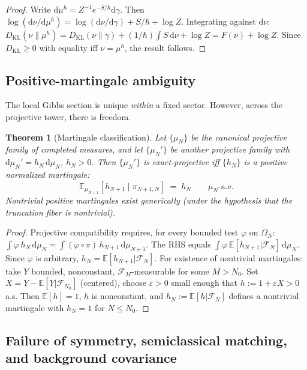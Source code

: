 \documentclass[12pt,a4paper]{article}
\theoremstyle{plain}
\newtheorem{theorem}{Theorem}[section]
\theoremstyle{definition}
\theoremstyle{remark}
\newcommand{\dd}{\mathrm{d}}
\newcommand{\cF}{\mathcal{F}}
\newcommand{\E}{\mathbb{E}}
\newcommand{\DKL}{D_{\mathrm{KL}}}
\begin{document}
\begin{proof}
Write $\dd\mu^\hbar = Z^{-1}e^{-S/\hbar}\dd\gamma$.  Then
$\log(\dd\nu/\dd\mu^\hbar) = \log(\dd\nu/\dd\gamma) + S/\hbar +
\log Z$.  Integrating against $\dd\nu$:
$\DKL(\nu\|\mu^\hbar) = \DKL(\nu\|\gamma) + (1/\hbar)\int S\,\dd\nu
+ \log Z = F(\nu) + \log Z$.  Since $\DKL \ge 0$ with equality iff
$\nu = \mu^\hbar$, the result follows.
\end{proof}

\subsection{Positive-martingale ambiguity}

The local Gibbs section is unique \emph{within} a fixed sector.
However, across the projective tower, there is freedom.

\begin{theorem}[Martingale classification]
\label{thm:martingale}
Let $\{\mu_N\}$ be the canonical projective family of completed
measures, and let $\{\mu_N'\}$ be another projective family with
$\dd\mu_N' = h_N\,\dd\mu_N$, $h_N > 0$.  Then $\{\mu_N'\}$ is
exact-projective iff $\{h_N\}$ is a positive normalized martingale:
\begin{equation}
  \E_{\mu_{N+1}}[h_{N+1} \mid \pi_{N+1,N}] \;=\; h_N
  \qquad \mu_N\text{-a.e.}
\end{equation}
Nontrivial positive martingales exist generically
(under the hypothesis that the truncation fiber is nontrivial).
\end{theorem}

\begin{proof}
Projective compatibility requires, for every bounded test $\varphi$
on $\Omega_N$:
$\int\varphi\,h_N\,\dd\mu_N = \int(\varphi\circ\pi)\,h_{N+1}\,
\dd\mu_{N+1}$.  The RHS equals
$\int\varphi\,\E[h_{N+1}|\cF_N]\,\dd\mu_N$.  Since $\varphi$ is
arbitrary, $h_N = \E[h_{N+1}|\cF_N]$.  For existence of nontrivial
martingales: take $Y$ bounded, nonconstant, $\cF_M$-measurable for
some $M > N_0$.  Set $X = Y - \E[Y|\cF_{N_0}]$ (centered), choose
$\varepsilon > 0$ small enough that $h := 1 + \varepsilon X > 0$
a.s.  Then $\E[h] = 1$, $h$ is nonconstant, and
$h_N := \E[h|\cF_N]$ defines a nontrivial martingale with
$h_N = 1$ for $N \le N_0$.
\end{proof}

\subsection{Failure of symmetry, semiclassical matching,
  and background covariance}
\end{document}
